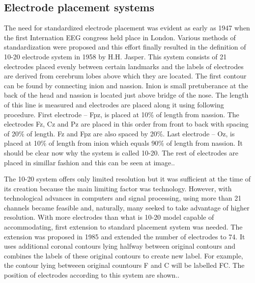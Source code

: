 \subsection{Electrode placement systems}
The need for standardized electrode placement was evident as early as 1947 when
the first Internation EEG congress held place in London. Various methods of
standardization were proposed and this effort finally resulted in the definition
of 10-20 electrode system in 1958 by H.H. Jasper. \cite{placeSys} 
This system consists of 21 electrodes placed evenly between certain landmarks
and the labels of electrodes are derived from cerebrum lobes above which they
are located. The first contour can be found by connecting inion and nassion.
Inion is small pretuberance at the back of the head and nassion is located just
above bridge of the nose. The length of this line is measured and electrodes are
placed along it using following procedure. First electrode -- Fpz, is placed at
10\% of length from nassion. The electrodes Fz, Cz and Pz are placed in this
order from front to back with spacing of 20\% of length. Fz and Fpz are also
spaced by 20\%. Last electrode -- Oz, is placed at 10\% of length from inion
which equals 90\% of length from nassion. It should be clear now why the system
is called 10-20. The rest of electrodes are placed in simillar fashion and this
can be seen at image.. %

The 10-20 system offers only limited resolution but it was sufficient at the
time of its creation because the main limiting factor was technology. However,
with technological advances in computers and signal processing, using more than
21 channels became feasible and, naturally, many seeked to take advantage of
higher resolution. With more electrodes than what is 10-20 model capable of
accommodating, first extension to standard placement system was needed. The
extension was proposed in 1985 and extended the number of electrodes to 74. It
uses additional coronal contours lying halfway between original contours and
combines the labels of these original contours to create new label. For example,
the contour lying betweeen original countours F and C will be labelled FC.
\cite{placeSys} The position of electrodes according to this system are shown..

